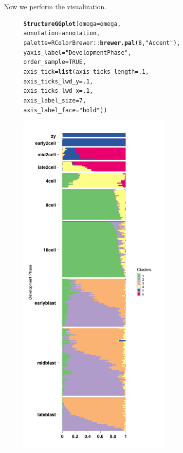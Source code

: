 \documentclass[12pt]{article}\usepackage[]{graphicx}\usepackage[usenames,dvipsnames]{color}
\makeatletter
\newcommand{\hlnum}[1]{\textcolor[rgb]{0.686,0.059,0.569}{#1}}%
\newcommand{\hlstr}[1]{\textcolor[rgb]{0.192,0.494,0.8}{#1}}%
\newcommand{\hlopt}[1]{\textcolor[rgb]{0,0,0}{#1}}%
\newcommand{\hlstd}[1]{\textcolor[rgb]{0.345,0.345,0.345}{#1}}%
\newcommand{\hlkwc}[1]{\textcolor[rgb]{0.333,0.667,0.333}{#1}}%
\newcommand{\hlkwd}[1]{\textcolor[rgb]{0.737,0.353,0.396}{\textbf{#1}}}%
\newenvironment{kframe}{%
 \def\at@end@of@kframe{}%
 \ifinner\ifhmode%
  \def\at@end@of@kframe{\end{minipage}}%
  \begin{minipage}{\columnwidth}%
 \fi\fi%
 \def\FrameCommand##1{\hskip\@totalleftmargin \hskip-\fboxsep
 \colorbox{shadecolor}{##1}\hskip-\fboxsep
     \hskip-\linewidth \hskip-\@totalleftmargin \hskip\columnwidth}%
 \MakeFramed {\advance\hsize-\width
   \@totalleftmargin\z@ \linewidth\hsize
   \@setminipage}}%
 {\par\unskip\endMakeFramed%
 \at@end@of@kframe}
\newenvironment{knitrout}{}{} %
\makeatother
\begin{document}
Now we perform the visualization.

\begin{figure}[htp]
\begin{center}
\begin{knitrout}
\color{fgcolor}\begin{kframe}
\begin{alltt}
\hlkwd{StructureGGplot}\hlstd{(}\hlkwc{omega} \hlstd{= omega,}
                \hlkwc{annotation} \hlstd{= annotation,}
                \hlkwc{palette} \hlstd{= RColorBrewer}\hlopt{::}\hlkwd{brewer.pal}\hlstd{(}\hlnum{8}\hlstd{,} \hlstr{"Accent"}\hlstd{),}
                \hlkwc{yaxis_label} \hlstd{=} \hlstr{"Development Phase"}\hlstd{,}
                \hlkwc{order_sample} \hlstd{=} \hlnum{TRUE}\hlstd{,}
                \hlkwc{axis_tick} \hlstd{=} \hlkwd{list}\hlstd{(}\hlkwc{axis_ticks_length} \hlstd{=} \hlnum{.1}\hlstd{,}
                                 \hlkwc{axis_ticks_lwd_y} \hlstd{=} \hlnum{.1}\hlstd{,}
                                 \hlkwc{axis_ticks_lwd_x} \hlstd{=} \hlnum{.1}\hlstd{,}
                                 \hlkwc{axis_label_size} \hlstd{=} \hlnum{7}\hlstd{,}
                                 \hlkwc{axis_label_face} \hlstd{=} \hlstr{"bold"}\hlstd{))}
\end{alltt}
\end{kframe}
\includegraphics[width=3in,height=7in]{figure/plot_topic_deng-1} 

\end{knitrout}
\end{center}
\end{figure}
\end{document}
